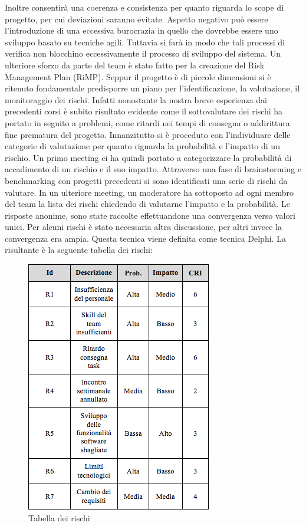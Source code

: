 Inoltre consentirà una coerenza e consistenza per quanto riguarda lo scope di progetto, per cui deviazioni saranno evitate.
Aspetto negativo può essere l’introduzione di una eccessiva burocrazia in quello che dovrebbe essere uno sviluppo basato su tecniche agili. Tuttavia si farà in modo che tali processi di verifica non blocchino eccessivamente il processo di sviluppo del sistema.
Un ulteriore sforzo da parte del team è stato fatto per la creazione del Risk Management Plan (RiMP).
Seppur il progetto è di piccole dimensioni si è ritenuto fondamentale predisporre un piano per l’identificazione, la valutazione, il monitoraggio dei rischi.
Infatti nonostante la nostra breve esperienza dai precedenti corsi è subito risultato evidente come il sottovalutare dei rischi ha portato in seguito a problemi, come ritardi nei tempi di consegna o addirittura fine prematura del progetto.
Innanzitutto si è proceduto con l’individuare delle categorie di valutazione per quanto riguarda la probabilità e l’impatto di un rischio.
Un primo meeting ci ha quindi portato a categorizzare la probabilità di accadimento di un rischio e il suo impatto.
Attraverso una fase di brainstorming e benchmarking con progetti precedenti si sono identificati una serie di rischi da valutare. 
In un ulteriore meeting, un moderatore ha sottoposto ad ogni membro del team la lista dei rischi chiedendo di valutarne l’impatto e la probabilità. Le risposte anonime, sono state raccolte effettuandone una convergenza verso valori unici.
Per alcuni rischi è stato necessaria altra discussione, per altri invece la convergenza era ampia. Questa tecnica viene definita come tecnica Delphi.
La risultante è la seguente tabella dei rischi:
\begin{figure}[h]
\centering
\includegraphics[scale=.6]{img/17.png}
\caption{Tabella dei rischi}
\label{fig:cd}
\end{figure}
